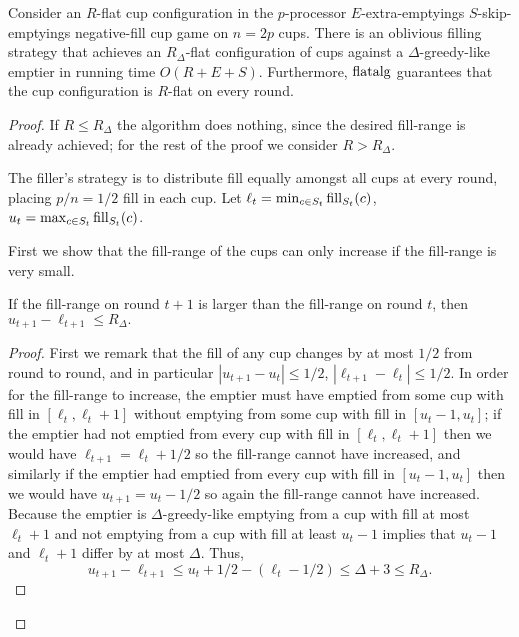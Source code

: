 \begin{lemma}
  \label{lem:flatalg}
  Consider an $R$-flat cup configuration in the $p$-processor
  $E$-extra-emptyings $S$-skip-emptyings negative-fill cup game on $n =
  2p$ cups. There is an oblivious filling strategy
   that achieves an $R_\Delta$-flat
  configuration of cups against a $\Delta$-greedy-like emptier in
  running time $O(R+E+S)$. Furthermore,
  $\operatorname{\text{\textup{flatalg}}}$ guarantees that the cup configuration is $R$-flat on every round.
\end{lemma}
\begin{proof}
  If $R \le R_\Delta$ the algorithm does nothing, since the
  desired fill-range is already achieved; for
  the rest of the proof we consider $R > R_\Delta$.

  The filler's strategy is to distribute fill equally amongst all
  cups at every round, placing $p/n = 1/2$ fill in each cup. 
  Let $\ell_t = \min_{c\in S_t} \operatorname{\text{\textup{fill}}}_{S_t}(c)$, $u_t = \max_{c\in S_t} \operatorname{\text{\textup{fill}}}_{S_t}(c)$. 

  First we show that the fill-range of the cups can only increase
  if the fill-range is very small.
  \begin{clm}
    \label{clm:fillRangeUpIFFfillRangeSmall}
    If the fill-range on round $t+1$ is larger than the
    fill-range on round $t$, then $u_{t+1} - \ell_{t+1} \le R_\Delta.$
  \end{clm}
  \begin{proof}
    First we remark that the fill of any cup changes by at most
    $1/2$ from round to round, and in particular $|u_{t+1}-u_t|
    \le 1/2$, $|\ell_{t+1} - \ell_t|\le 1/2$.
    In order for the fill-range to increase, the emptier must have
    emptied from some cup with fill in $[\ell_t, \ell_t + 1]$ without
    emptying from some cup with fill in $[u_t-1, u_t]$; if the emptier
    had not emptied from every cup with fill in $[\ell_t, \ell_t+1]$
    then we would have $\ell_{t+1} = \ell_t + 1/2$ so the
    fill-range cannot have increased, and similarly if the emptier
    had emptied from every cup with fill in $[u_t-1, u_t]$ then we
    would have $u_{t+1} = u_t - 1/2$ so again the fill-range 
    cannot have increased. Because the emptier is $\Delta$-greedy-like
    emptying from a cup with fill at most $\ell_t+1$ and not
    emptying from a cup with fill at least $u_t-1$ implies that
    $u_t-1$ and $\ell_t+1$ differ by at most $\Delta$.
    Thus, 
    $$u_{t+1} - \ell_{t+1} \le u_t +1/2 - (\ell_t -1/2)  \le \Delta + 3 \le R_\Delta.$$
  \end{proof}


\end{proof}
